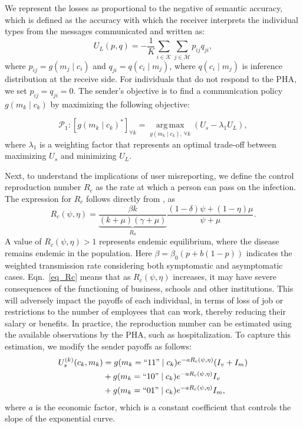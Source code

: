 \documentclass[sigconf,review]{acmart}
\DeclareMathOperator*{\argmax}{arg\,max}
\begin{document}
We represent the losses as proportional to the negative of semantic accuracy, which is defined as the accuracy with which the receiver interprets the individual types from the messages communicated  and written as:
\begin{equation}
U_L(p, q) = -\frac{1}{K} \sum\limits_{i \in \mathcal{K}} \sum\limits_{j \in \mathcal{M}} p_{ij} q_{ji},
\end{equation}
where $p_{ij} = g(m_j \mid c_i)$ and $q_{ji} = q(c_i \mid m_j)$, where $q(c_i \mid m_j)$ is inference distribution at the receive side. For individuals that do not respond to the PHA, we set $p_{ij} = q_{ji} = 0$.
The sender's objective is to find a communication policy $g(m_k \mid c_k)$ by maximizing the following objective:

\begin{equation}
\mathcal{P}_1:\left[g(m_k \mid c_k)^{\ast}\right]_{\forall k} = \argmax\limits_{g(m_k \mid c_k),\, \forall k} \left( U_s - \lambda_1 U_L \right),
\end{equation}
where $\lambda_1$ is a weighting factor that represents an optimal trade-off between maximizing $U_s$ and minimizing $U_L$.


Next, to  understand  the   implications of user    misreporting, we define the control reproduction number $R_c$ as the rate at which a person can pass on the infection. The expression for $R_c$ follows  directly from \cite{ChoiJTB2020}, as
\begin{equation}
    R_c(\psi,\eta) = \underbrace{\frac{\beta k}{(k+\mu)(\gamma + \mu)}}_{R_0}\frac{(1-\delta)\psi + (1-\eta)\mu}{\psi + \mu}.
\label{eq_Rc}
\end{equation} 
A value of $R_c(\psi,\eta)>1$ represents endemic equilibrium, where the disease remains endemic in the population. Here $\beta = \beta_0(p+b(1-p))$  indicates the weighted transmission rate considering both symptomatic and asymptomatic
cases. Eqn.~\ref{eq_Rc} means that as  $R_c(\psi,\eta)$ increases, it may have severe consequences of the functioning of business, schools and other institutions. This will adversely impact the payoffs of each individual, in terms of loss of job or restrictions to the number of employees that can work, thereby reducing their salary or benefits. In practice, the reproduction number can be estimated using the available observations  \cite{ShiArxiv2025} by the PHA, such as hospitalization. To capture this estimation, we modify the sender payoffs as follows:
\begin{equation}
    \begin{aligned}
    U_s^{(k)}(c_k,m_k) &= g(m_k = ``11"\mid c_k) e^{-aR_c(\psi,\eta)}(I_v+I_m) \\ & + g(m_k = ``10"\mid c_k)e^{-aR_c(\psi,\eta)}I_{v} \\ &+ g(m_k = ``01"\mid c_k) e^{-aR_c(\psi,\eta)}I_m,
    \label{eq_sender_payoff_modified}
    \end{aligned}
\end{equation}
where $a$ is the economic factor, which is a constant coefficient that controls the slope of  the exponential  curve.
\end{document}
